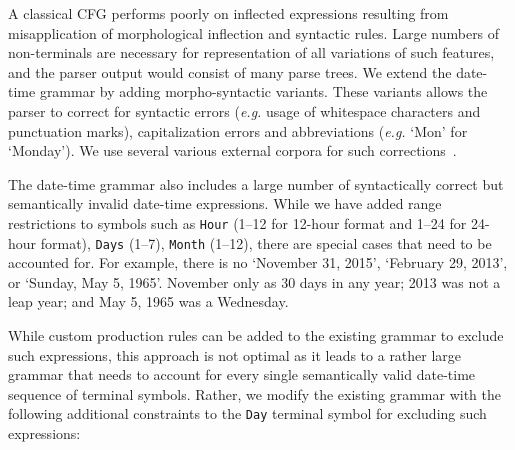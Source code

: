 A classical CFG performs poorly on inflected expressions resulting from misapplication of morphological inflection and syntactic rules. Large numbers of non-terminals are necessary for representation of all variations of such features, and the parser output would consist of many parse trees. We extend the date-time grammar by adding morpho-syntactic variants. These variants allows the parser to correct for syntactic errors (\textit{e.g.} usage of whitespace characters and punctuation marks), capitalization errors and abbreviations (\textit{e.g.} `Mon' for `Monday'). We use several various external corpora for such corrections~\cite{nltkcorpora}.

The date-time grammar also includes a large number of syntactically correct but semantically invalid
date-time expressions. While we have added range restrictions to symbols such as \texttt{Hour} (1--12 for 12-hour format and 1--24 for 24-hour format), \texttt{Days} (1--7), \texttt{Month} (1--12), there are special cases that need to be accounted for. For example, there is no  `November 31, 2015', `February 29, 2013', or `Sunday, May  5, 1965'. November only as 30 days in any year; 2013 was not a leap year; and May 5, 1965 was a Wednesday.

While custom production rules can be added to the existing grammar to exclude such expressions, this approach is not optimal as it leads to a rather large grammar that needs to account for every single semantically valid date-time sequence of terminal symbols. Rather, we modify the existing grammar with the following additional constraints to the \texttt{Day} terminal symbol for excluding such expressions:

